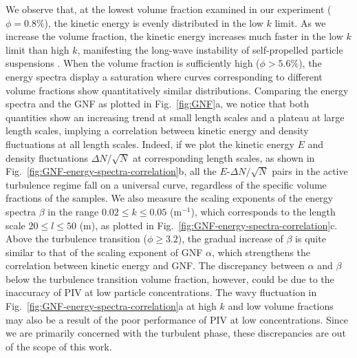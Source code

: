 \documentclass[twocolumn,aps,prl,amsmath,amssymb,longbibliography]{revtex4-2}
\begin{document}
We observe that, at the lowest volume fraction examined in our experiment ($\phi=0.8\%$), the kinetic energy is evenly distributed in the low $k$ limit.
As we increase the volume fraction, the kinetic energy increases much faster in the low $k$ limit than high $k$, manifesting the long-wave instability of self-propelled particle suspensions
\cite{AditiSimha2002, Saintillan2008a, Saintillan2008b,
Subramanian2009, Hohenegger2010, Bardfalvy2019, Peng2020}.
When the volume fraction is sufficiently high ($\phi>5.6\%$), the energy spectra display a saturation where curves corresponding to different volume fractions show quantitatively similar distributions.
Comparing the energy spectra and the GNF as plotted in Fig.~\ref{fig:GNF}a, we notice that both quantities show an increasing trend at small length scales and a plateau at large length scales, implying a correlation between kinetic energy and density fluctuations at all length scales.
Indeed, if we plot the kinetic energy $E$ and density fluctuations $\Delta N/\sqrt N$ at corresponding length scales, as shown in Fig.~\ref{fig:GNF-energy-spectra-correlation}b, all the $E$-$\Delta N/\sqrt N$ pairs in the active turbulence regime fall on a universal curve, regardless of the specific volume fractions of the samples.
We also measure the scaling exponents of the energy spectra $\beta$ in the range $0.02\le k \le 0.05$ (\textmu m$^{-1}$), which corresponds to the length scale $20\le l \le 50$ (\textmu m), as plotted in Fig.~\ref{fig:GNF-energy-spectra-correlation}c. Above the turbulence transition ($\phi\ge 3.2$), the gradual increase of $\beta$ is quite similar to that of the scaling exponent of GNF $\alpha$, which strengthens the correlation between kinetic energy and GNF.
The discrepancy between $\alpha$ and $\beta$ below the turbulence transition volume fraction, however, could be due to the inaccuracy of PIV at low particle concentrations. The wavy fluctuation in Fig.~\ref{fig:GNF-energy-spectra-correlation}a at high $k$ and low volume fractions may also be a result of the poor performance of PIV at low concentrations. Since we are primarily concerned with the turbulent phase, these discrepancies are out of the scope of this work.
\end{document}
